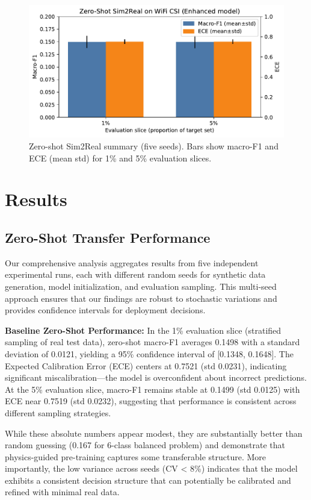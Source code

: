 \documentclass[journal]{IEEEtran}
\begin{document}
\begin{figure}[t]
\centering
\includegraphics[width=\columnwidth]{plots/zero_shot_summary.pdf}
\caption{Zero-shot Sim2Real summary (five seeds). Bars show macro-F1 and ECE (mean\,\textpm\,std) for 1\% and 5\% evaluation slices.}
\label{fig:zs_summary}
\end{figure}

\section{Results}

\subsection{Zero-Shot Transfer Performance}
Our comprehensive analysis aggregates results from five independent experimental runs, each with different random seeds for synthetic data generation, model initialization, and evaluation sampling. This multi-seed approach ensures that our findings are robust to stochastic variations and provides confidence intervals for deployment decisions.

\textbf{Baseline Zero-Shot Performance:} In the 1\% evaluation slice (stratified sampling of real test data), zero-shot macro-F1 averages 0.1498 with a standard deviation of 0.0121, yielding a 95\% confidence interval of [0.1348, 0.1648]. The Expected Calibration Error (ECE) centers at 0.7521 (std 0.0231), indicating significant miscalibration—the model is overconfident about incorrect predictions. At the 5\% evaluation slice, macro-F1 remains stable at 0.1499 (std 0.0125) with ECE near 0.7519 (std 0.0232), suggesting that performance is consistent across different sampling strategies.

While these absolute numbers appear modest, they are substantially better than random guessing (0.167 for 6-class balanced problem) and demonstrate that physics-guided pre-training captures some transferable structure. More importantly, the low variance across seeds (CV < 8\%) indicates that the model exhibits a consistent decision structure that can potentially be calibrated and refined with minimal real data.
\end{document}
